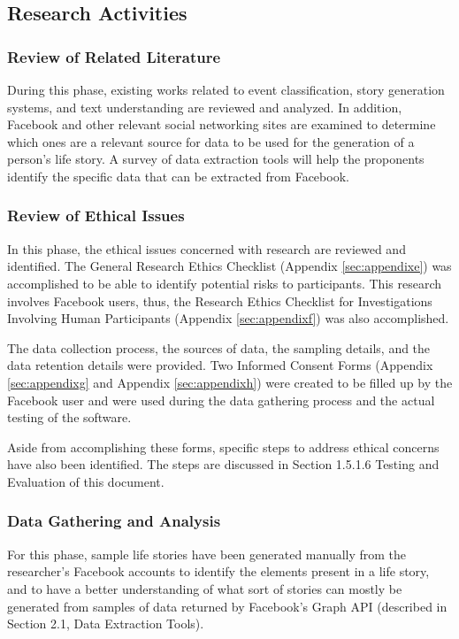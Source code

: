 \subsection{Research Activities}

\subsubsection{Review of Related Literature}
During this phase, existing works related to event classification, story generation systems, and text understanding are reviewed and analyzed. In addition, Facebook and other relevant social networking sites are examined to determine which ones are a relevant source for data to be used for the generation of a person's life story. A survey of data extraction tools will help the proponents identify the specific data that can be extracted from Facebook.

\subsubsection{Review of Ethical Issues}
In this phase, the ethical issues concerned with research are reviewed and identified. The General Research Ethics Checklist (Appendix \ref{sec:appendixe}) was accomplished to be able to identify potential risks to participants. This research involves Facebook users, thus, the Research Ethics Checklist for Investigations Involving Human Participants (Appendix \ref{sec:appendixf}) was also accomplished. 

The data collection process, the sources of data, the sampling details, and the data retention details were provided. Two Informed Consent Forms (Appendix \ref{sec:appendixg} and Appendix \ref{sec:appendixh}) were created to be filled up by the Facebook user and were used during the data gathering process and the actual testing of the software.

Aside from accomplishing these forms, specific steps to address ethical concerns have also been identified. The steps are discussed in Section 1.5.1.6 Testing and Evaluation of this document.

\subsubsection{Data Gathering and Analysis}
For this phase, sample life stories have been generated manually from the researcher's Facebook accounts to identify the elements present in a life story, and to have a better understanding of what sort of stories can mostly be generated from samples of data returned by Facebook's Graph API (described in Section 2.1, Data Extraction Tools).

